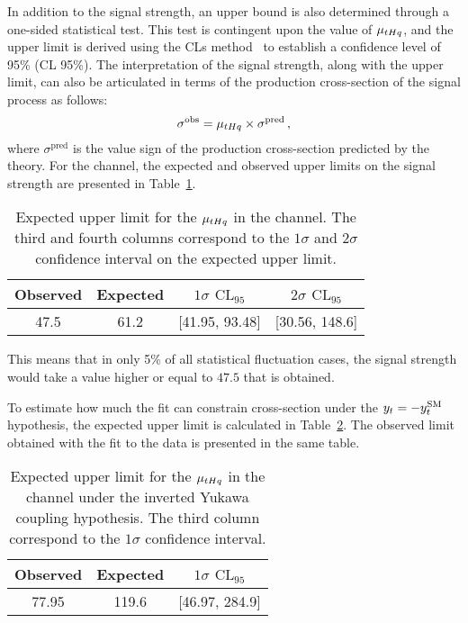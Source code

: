 In addition to the signal strength, an upper bound is also determined through a one-sided statistical test. 
This test is contingent upon the value of $\mu_{tHq}$, and the upper limit is derived using the CLs 
method~\cite{Read:2002hq} to establish a confidence level of 95\% (CL 95\%). 
The interpretation of the signal strength, along with the upper limit, can also be articulated in terms of the production cross-section of the signal process as follows:
\begin{equation*}
	\sigma^{\text{obs}} = \mu_{tHq} \times \sigma^{\text{pred}} \, ,
\end{equation*}
where $\sigma^{\text{pred}}$ is the value sign of the production cross-section predicted by the theory. 
For the \dilepOStau channel, the expected and observed upper limits on the signal strength are presented in Table~\ref{tab:ASIMOV:OS:ExpectedLimit}.
\begin{table}[h]
\centering
\begin{tabular}{c|c|c|c}
\toprule
Observed 		& Expected	& $1\sigma$ $\text{CL}_{95}$       		& $2\sigma$ $\text{CL}_{95}$        \\ \midrule
     47.5		& 61.2  	& [41.95, 93.48] 	& [30.56,  148.6] \\ \bottomrule
\end{tabular}
\caption{Expected upper limit for the $\mu_{tHq}$ in the \dilepOStau channel. 
The third and fourth columns correspond to the $1\sigma$ and $2\sigma$ confidence interval on the expected
upper limit. }
\label{tab:ASIMOV:OS:ExpectedLimit}
\end{table}
This means that in only 5\% of all statistical fluctuation cases, the signal strength would take a value higher or equal to $47.5$ that is obtained.

To estimate how much the fit can constrain \tHq cross-section under the $y_{t}=-y_{t}^{\text{SM}}$ hypothesis, 
the expected upper limit is calculated in Table~\ref{tab:ASIMOV:OS:ExpectedLimit_ytm1}. 
The observed limit obtained with the fit to the data is presented in the same table.
\begin{table}[h]
\centering
\begin{tabular}{c|c|c}
\toprule
Observed	& Expected  & $1\sigma$ $\text{CL}_{95}$             \\ \midrule
77.95	& 119.6  & [46.97, 284.9]    	\\ \bottomrule
\end{tabular}
\caption{Expected upper limit for the $\mu_{tHq}$ in the \dilepOStau channel under 
the inverted Yukawa coupling hypothesis. The third column correspond
to the $1\sigma$ confidence interval.}
\label{tab:ASIMOV:OS:ExpectedLimit_ytm1}
\end{table}




